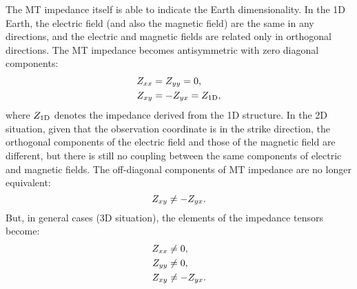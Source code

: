 	The MT impedance itself is able to indicate the Earth dimensionality. In the 1D Earth, the electric field (and also the magnetic field) are the same in any directions, and the electric and magnetic fields 
	are related only in orthogonal directions.
	The MT impedance becomes antisymmetric with zero diagonal components:
	\begin{equation}\label{eq:z_cond_1d}
	\begin{split}
		\Zxx & = \Zyy = 0, \\
		\Zxy & = - \Zyx = \ZOneD,
	\end{split}
	\end{equation}
	where $Z_\text{1D}$ denotes the impedance derived from the 1D structure.
	In the 2D situation, given that the observation coordinate is in the strike direction, the orthogonal components of the electric field and those of the magnetic field are different, but there is still no coupling between the same components of electric and magnetic fields. The off-diagonal components of MT impedance are no longer equivalent:
	\begin{equation}
		Z_{xy} \neq - Z_{yx}.
	\end{equation}
	But, in general cases (3D situation), the elements of the impedance tensors become:
	\begin{equation}
		\begin{split}
			Z_{xx} & \neq 0, \\
			Z_{yy} & \neq 0, \\
			Z_{xy} & \neq -Z_{yx}. \\
		\end{split}
	\end{equation}

	
